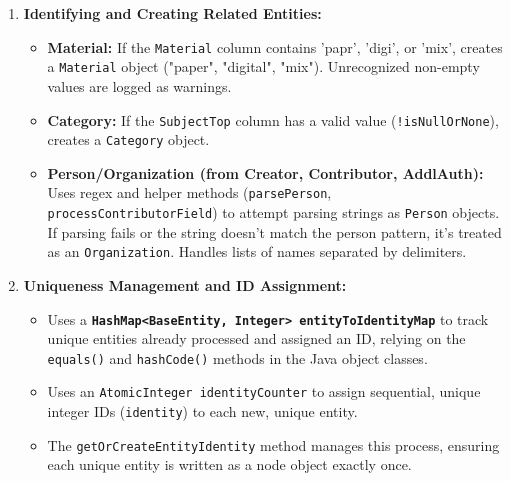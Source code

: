 \begin{enumerate}
    \item \textbf{Identifying and Creating Related Entities:}
        \begin{itemize}
            \item \textbf{Material:} If the \texttt{Material} column contains 'papr', 'digi', or 'mix', creates a \texttt{Material} object ("paper", "digital", "mix"). Unrecognized non-empty values are logged as warnings.
            \item \textbf{Category:} If the \texttt{SubjectTop} column has a valid value (\texttt{!isNullOrNone}), creates a \texttt{Category} object.
            \item \textbf{Person/Organization (from Creator, Contributor, AddlAuth):} Uses regex and helper methods (\texttt{parsePerson}, \texttt{processContributorField}) to attempt parsing strings as \texttt{Person} objects. If parsing fails or the string doesn't match the person pattern, it's treated as an \texttt{Organization}. Handles lists of names separated by delimiters.
        \end{itemize}

    \item \textbf{Uniqueness Management and ID Assignment:}
        \begin{itemize}
            \item Uses a \textbf{\texttt{HashMap<BaseEntity, Integer> entityToIdentityMap}} to track unique entities already processed and assigned an ID, relying on the \texttt{equals()} and \texttt{hashCode()} methods in the Java object classes.
            \item Uses an \texttt{AtomicInteger identityCounter} to assign sequential, unique integer IDs (\texttt{identity}) to each new, unique entity.
            \item The \texttt{getOrCreateEntityIdentity} method manages this process, ensuring each unique entity is written as a node object exactly once.
        \end{itemize}


\end{enumerate}
